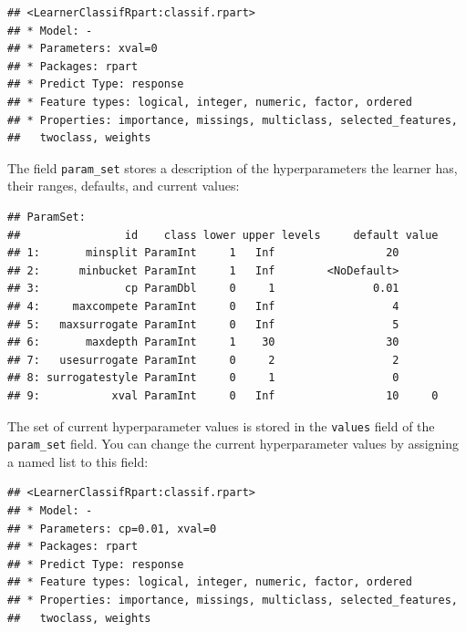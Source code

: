 \documentclass[]{scrbook}
\newenvironment{Shaded}{\begin{snugshade}}{\end{snugshade}}
\newcommand{\DataTypeTok}[1]{\textcolor[rgb]{0.13,0.29,0.53}{#1}}
\newcommand{\DecValTok}[1]{\textcolor[rgb]{0.00,0.00,0.81}{#1}}
\newcommand{\FloatTok}[1]{\textcolor[rgb]{0.00,0.00,0.81}{#1}}
\newcommand{\KeywordTok}[1]{\textcolor[rgb]{0.13,0.29,0.53}{\textbf{#1}}}
\newcommand{\NormalTok}[1]{#1}
\newcommand{\OperatorTok}[1]{\textcolor[rgb]{0.81,0.36,0.00}{\textbf{#1}}}
\newcommand{\StringTok}[1]{\textcolor[rgb]{0.31,0.60,0.02}{#1}}
\renewenvironment{Shaded} {\begin{snugshade}\small} {\end{snugshade}}
\begin{document}
\begin{verbatim}
## <LearnerClassifRpart:classif.rpart>
## * Model: -
## * Parameters: xval=0
## * Packages: rpart
## * Predict Type: response
## * Feature types: logical, integer, numeric, factor, ordered
## * Properties: importance, missings, multiclass, selected_features,
##   twoclass, weights
\end{verbatim}

The field \texttt{param\_set} stores a description of the hyperparameters the learner has, their ranges, defaults, and current values:

\begin{Shaded}
\end{Shaded}

\begin{verbatim}
## ParamSet: 
##                id    class lower upper levels     default value
## 1:       minsplit ParamInt     1   Inf                 20      
## 2:      minbucket ParamInt     1   Inf        <NoDefault>      
## 3:             cp ParamDbl     0     1               0.01      
## 4:     maxcompete ParamInt     0   Inf                  4      
## 5:   maxsurrogate ParamInt     0   Inf                  5      
## 6:       maxdepth ParamInt     1    30                 30      
## 7:   usesurrogate ParamInt     0     2                  2      
## 8: surrogatestyle ParamInt     0     1                  0      
## 9:           xval ParamInt     0   Inf                 10     0
\end{verbatim}

The set of current hyperparameter values is stored in the \texttt{values} field of the \texttt{param\_set} field.
You can change the current hyperparameter values by assigning a named list to this field:

\begin{Shaded}
\end{Shaded}

\begin{verbatim}
## <LearnerClassifRpart:classif.rpart>
## * Model: -
## * Parameters: cp=0.01, xval=0
## * Packages: rpart
## * Predict Type: response
## * Feature types: logical, integer, numeric, factor, ordered
## * Properties: importance, missings, multiclass, selected_features,
##   twoclass, weights
\end{verbatim}
\end{document}
